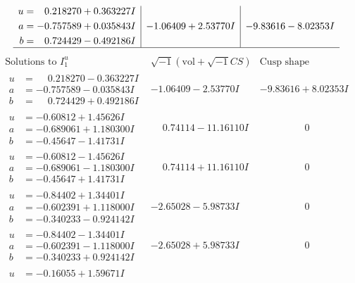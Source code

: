\documentclass[1p]{elsarticle_modified}
\theoremstyle{definition}
\newcommand{\I}{\sqrt{-1}}
\begin{document}
$$\begin{array}{c|c|c}
\begin{aligned}
u &= \phantom{-}0.218270 + 0.363227 I \\
a &= -0.757589 + 0.035843 I \\
b &= \phantom{-}0.724429 - 0.492186 I\end{aligned}
 & -1.06409 + 2.53770 I & -9.83616 - 8.02353 I\\
 \hline 
 \end{array}$$\newpage$$\begin{array}{c|c|c}  
\text{Solutions to }I^u_{1}& \I (\text{vol} + \sqrt{-1}CS) & \text{Cusp shape}\\
 \hline 
\begin{aligned}
u &= \phantom{-}0.218270 - 0.363227 I \\
a &= -0.757589 - 0.035843 I \\
b &= \phantom{-}0.724429 + 0.492186 I\end{aligned}
 & -1.06409 - 2.53770 I & -9.83616 + 8.02353 I \\ \hline\begin{aligned}
u &= -0.60812 + 1.45626 I \\
a &= -0.689061 + 1.180300 I \\
b &= -0.45647 - 1.41731 I\end{aligned}
 & \phantom{-}0.74114 - 11.16110 I & \phantom{-0.000000 } 0 \\ \hline\begin{aligned}
u &= -0.60812 - 1.45626 I \\
a &= -0.689061 - 1.180300 I \\
b &= -0.45647 + 1.41731 I\end{aligned}
 & \phantom{-}0.74114 + 11.16110 I & \phantom{-0.000000 } 0 \\ \hline\begin{aligned}
u &= -0.84402 + 1.34401 I \\
a &= -0.602391 + 1.118000 I \\
b &= -0.340233 - 0.924142 I\end{aligned}
 & -2.65028 - 5.98733 I & \phantom{-0.000000 } 0 \\ \hline\begin{aligned}
u &= -0.84402 - 1.34401 I \\
a &= -0.602391 - 1.118000 I \\
b &= -0.340233 + 0.924142 I\end{aligned}
 & -2.65028 + 5.98733 I & \phantom{-0.000000 } 0 \\ \hline\begin{aligned}
u &= -0.16055 + 1.59671 I \\

\end{aligned}
\end{array}$$
\end{document}
